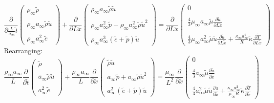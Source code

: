 \documentclass[11pt, a4paper]{article}
\newcommand{\parder}[2]{\frac{\partial {#1}}{\partial {#2}}}
\begin{document}
\begin{equation}
    \parder{}{\displaystyle\frac{L}{a_\infty}\tilde{t}}\begin{pmatrix}
        \rho_\infty\tilde{\rho} \\\\
        \rho_\infty a_\infty\tilde{\rho}\tilde{u} \\\\
        \rho_\infty a_\infty^2\tilde{e}
    \end{pmatrix}+\parder{}{L\tilde{x}}\begin{pmatrix}
        \rho_\infty a_\infty\tilde{\rho}\tilde{u} \\\\
        \rho_\infty a_\infty^2\tilde{p}+\rho_\infty a_\infty^2\tilde{\rho}\tilde{u}^2 \\\\
        \rho_\infty a_\infty^3\left(\tilde{e}+\tilde{p}\right)\tilde{u}
    \end{pmatrix}=\parder{}{L\tilde{x}}\begin{pmatrix}
        0 \\\\
        \displaystyle\frac{4}{3}\mu_\infty a_\infty\tilde{\mu} \parder{\tilde{u}}{L\tilde{x}} \\\\
        \displaystyle\frac{4}{3}\mu_\infty a_\infty^2\tilde{\mu}\tilde{u}\parder{\tilde{u}}{L\tilde{x}}+\frac{\kappa_\infty a_\infty^2}{R}\tilde{\kappa}\parder{\tilde{T}}{L\tilde{x}}
    \end{pmatrix}
\end{equation}
Rearranging:
\begin{equation}
    \frac{\rho_\infty a_\infty}{L}\parder{}{\tilde{t}}\begin{pmatrix}
        \tilde{\rho} \\\\
        a_\infty\tilde{\rho}\tilde{u} \\\\
        a_\infty^2\tilde{e}
    \end{pmatrix}+\frac{\rho_\infty a_\infty}{L}\parder{}{\tilde{x}}\begin{pmatrix}
        \tilde{\rho}\tilde{u} \\\\
        a_\infty\tilde{p}+a_\infty\tilde{\rho}\tilde{u}^2 \\\\
        a_\infty^2\left(\tilde{e}+\tilde{p}\right)\tilde{u}
    \end{pmatrix}=\frac{\mu_\infty}{L^2}\parder{}{\tilde{x}}\begin{pmatrix}
        0 \\\\
        \displaystyle\frac{4}{3}a_\infty\tilde{\mu} \parder{\tilde{u}}{\tilde{x}} \\\\
        \displaystyle\frac{4}{3}a_\infty^2\tilde{\mu}\tilde{u}\parder{\tilde{u}}{\tilde{x}}+\frac{\kappa_\infty a_\infty^2}{\mu_\infty R}\tilde{\kappa}\parder{\tilde{T}}{\tilde{x}}
    \end{pmatrix}
\end{equation}
\end{document}
